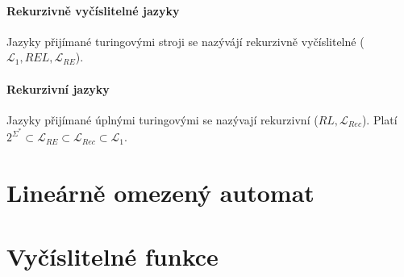 \paragraph*{Rekurzivně vyčíslitelné jazyky} Jazyky přijímané turingovými stroji se nazývájí rekurzivně vyčíslitelné ($\mathcal{L}_1, REL, \mathcal{L}_{RE}$).

\paragraph*{Rekurzivní jazyky} Jazyky přijímané úplnými turingovými se nazývají rekurzivní ($RL, \mathcal{L}_{Rec}$). Platí $2^{\Sigma^*} \subset \mathcal{L}_{RE} \subset \mathcal{L}_{Rec} \subset \mathcal{L}_1$.


\section{Lineárně omezený automat}



\section{Vyčíslitelné funkce}


